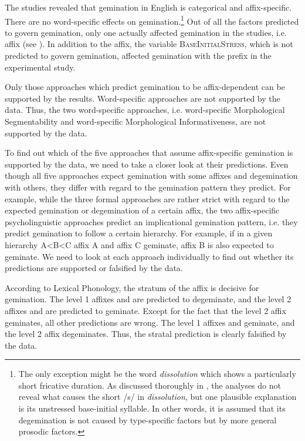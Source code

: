The studies revealed that gemination in English is categorical and affix-specific. There are no word-specific effects on gemination.\footnote{The only exception might be the word \textit{dissolution} which shows a particularly short fricative duration. As discussed thoroughly in , the analyses do not reveal what causes the short /s/ in \textit{dissolution}, but one plausible explanation is its unstressed base-initial syllable. In other words, it is assumed that its degemination is not caused by type-specific factors but by more general prosodic factors.} Out of all the factors predicted to govern gemination, only one actually affected gemination in the studies, i.e. affix (see ). 
In addition to the affix, the variable \textsc{BaseInitialStress}, which is not predicted to govern gemination,  affected gemination with the prefix  in the experimental study. 

Only those approaches which predict gemination to be affix-dependent can be supported by the results. Word-specific approaches are not supported by the data.
Thus, the two word-specific approaches, i.e. word-specific Morphological Segmentability and word-specific Morphological Informativeness, are  not supported by the data. 

To find out which of the five approaches that assume affix-specific gemination is supported by the data, we need to take a closer look at their predictions. Even though all five approaches expect  gemination with some affixes and degemination with others, they differ with regard to the gemination pattern they predict. For example, while the three formal approaches are rather strict with regard to the expected gemination or degemination of a  certain affix, the two affix-specific psycholinguistic approaches predict an implicational gemination pattern, i.e. they predict gemination to follow a certain hierarchy. For example, if in a given hierarchy A<B<C  affix A and affix C geminate, affix B is also expected to geminate. 
We need to look at each approach individually to find out whether its predictions are supported or falsified by the data. 

According to Lexical Phonology, the stratum of the affix is decisive for gemination. The level 1 affixes  and  are predicted to degeminate, and the level 2 affixes  and  are predicted to geminate. Except for the fact that the level 2 affix  geminates, all other predictions are wrong. The level 1 affixes  and  geminate, and the level 2 affix  degeminates. Thus, the stratal prediction is clearly falsified by the data.

